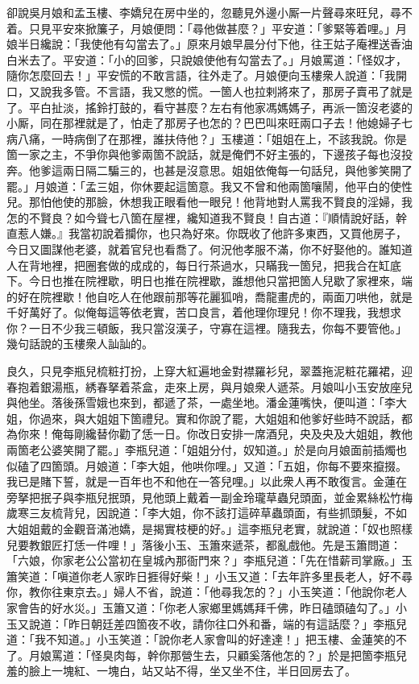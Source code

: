 卻說吳月娘和孟玉樓、李嬌兒在房中坐的，忽聽見外邊小厮一片聲尋來旺兒，尋不着。只見平安來掀簾子，月娘便問：「尋他做甚麼？」平安道：「爹緊等着哩。」月娘半日纔說：「我使他有勾當去了。」原來月娘早晨分付下他，往王姑子庵裡送香油白米去了。平安道：「小的回爹，只說娘使他有勾當去了。」月娘罵道：「怪奴才，隨你怎麼回去！」平安慌的不敢言語，往外走了。{}月娘便向玉樓衆人說道：「我開口，又說我多管。不言語，我又憋的慌。一箇人也拉剌將來了，那房子賣弔了就是了。平白扯淡，搖鈴打鼓的，看守甚麼？左右有他家馮媽媽子，再派一箇沒老婆的小厮，同在那裡就是了，怕走了那房子也怎的？巴巴叫來旺兩口子去！他媳婦子七病八痛，{}一時病倒了在那裡，誰扶侍他？」玉樓道：「姐姐在上，不該我說。你是箇一家之主，不爭你與他爹兩箇不說話，就是俺們不好主張的，下邊孩子每也沒投奔。他爹這兩日隔二騙三的，也甚是沒意思。姐姐依俺每一句話兒，與他爹笑開了罷。」月娘道：「孟三姐，你休要起這箇意。我又不曾和他兩箇嚷鬧，他平白的使性兒。那怕他使的那臉，休想我正眼看他一眼兒！他背地對人罵我不賢良的淫婦，我怎的不賢良？如今聳七八箇在屋裡，纔知道我不賢良！自古道：『順情說好話，幹直惹人嫌。』我當初說着攔你，也只為好來。你既收了他許多東西，又買他房子，今日又圖謀他老婆，就着官兒也看喬了。何況他孝服不滿，你不好娶他的。誰知道人在背地裡，把圈套做的成成的，每日行茶過水，只瞞我一箇兒，把我合在缸底下。今日也推在院裡歇，明日也推在院裡歇，誰想他只當把箇人兒歇了家裡來，端的好在院裡歇！他自吃人在他跟前那等花麗狐哨，喬龍畫虎的，{}兩面刀哄他，就是千好萬好了。似俺每這等依老實，苦口良言，着他理你理兒！你不理我，我想求你？一日不少我三頓飯，我只當沒漢子，守寡在這裡。{}隨我去，你每不要管他。」幾句話說的玉樓衆人訕訕的。

良久，只見李瓶兒梳粧打扮，上穿大紅遍地金對襟羅衫兒，翠蓋拖泥粧花羅裙，迎春抱着銀湯瓶，綉春拏着茶盒，走來上房，與月娘衆人遞茶。月娘叫小玉安放座兒與他坐。落後孫雪娥也來到，都遞了茶，一處坐地。潘金蓮嘴快，便叫道：「李大姐，你過來，與大姐姐下箇禮兒。實和你說了罷，大姐姐和他爹好些時不說話，都為你來！俺每剛纔替你勸了恁一日。你改日安排一席酒兒，央及央及大姐姐，教他兩箇老公婆笑開了罷。」李瓶兒道：「姐姐分付，奴知道。」於是向月娘面前插燭也似磕了四箇頭。月娘道：「李大姐，他哄你哩。」又道：「五姐，你每不要來攛掇。我已是賭下誓，就是一百年也不和他在一答兒哩。」以此衆人再不敢復言。金蓮在旁拏把抿子與李瓶兒抿頭，見他頭上戴着一副金玲瓏草蟲兒頭面，並金累絲松竹梅歲寒三友梳背兒，因說道：「李大姐，你不該打這碎草蟲頭面，有些抓頭髮，不如大姐姐戴的金觀音滿池嬌，是揭實枝梗的好。」{}這李瓶兒老實，就說道：「奴也照樣兒要教銀匠打恁一件哩！」落後小玉、玉簫來遞茶，都亂戲他。先是玉簫問道：「六娘，你家老公公當初在皇城內那衙門來？」李瓶兒道：「先在惜薪司掌廠。」玉簫笑道：「嗔道你老人家昨日捱得好柴！」小玉又道：「去年許多里長老人，好不尋你，教你往東京去。」婦人不省，說道：「他尋我怎的？」小玉笑道：「他說你老人家會告的好水災。」玉簫又道：「你老人家鄉里媽媽拜千佛，昨日磕頭磕勾了。」小玉又說道：「昨日朝廷差四箇夜不收，請你往口外和番，端的有這話麼？」李瓶兒道：「我不知道。」小玉笑道：「說你老人家會叫的好達達！」把玉樓、金蓮笑的不了。月娘罵道：「怪臭肉每，幹你那營生去，只顧奚落他怎的？」於是把箇李瓶兒羞的臉上一塊紅、一塊白，站又站不得，坐又坐不住，{}半日回房去了。

